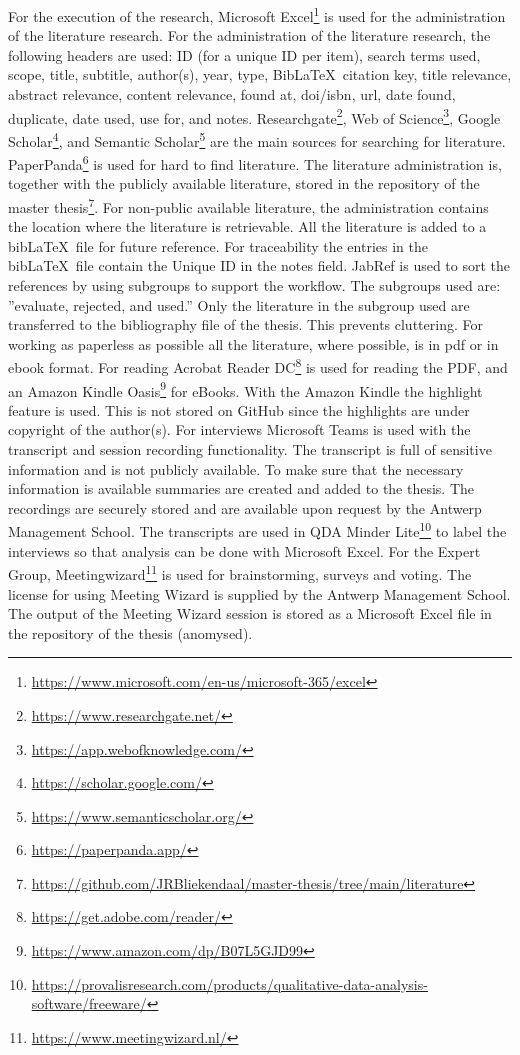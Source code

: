 For the execution of the research, Microsoft Excel\footnote{\url{https://www.microsoft.com/en-us/microsoft-365/excel}} is used for the administration of the literature research. For the administration of the literature research, the following headers are used: ID (for a unique ID per item), search terms used, scope, title, subtitle, author(s), year, type, Bib\LaTeX\ citation key, title relevance, abstract relevance, content relevance, found at, doi/isbn, url, date found, duplicate, date used, use for, and notes. Researchgate\footnote{\url{https://www.researchgate.net/}}, Web of Science\footnote{\url{https://app.webofknowledge.com/}}, Google Scholar\footnote{\url{https://scholar.google.com/}}, and Semantic Scholar\footnote{\url{https://www.semanticscholar.org/}} are the main sources for searching for literature. PaperPanda\footnote{\url{https://paperpanda.app/}} is used for hard to find literature. The literature administration is, together with the publicly available literature, stored in the repository of the master thesis\footnote{\url{https://github.com/JRBliekendaal/master-thesis/tree/main/literature}}. For non-public available literature, the administration contains the location where the literature is retrievable. All the literature is added to a bib\LaTeX\ file for future reference. For traceability the entries in the bib\LaTeX\ file contain the Unique ID in the notes field. JabRef is used to sort the references by using subgroups to support the workflow. The subgroups used are: ''evaluate, rejected, and used.'' Only the literature in the subgroup used are transferred to the bibliography file of the thesis. This prevents cluttering. For working as paperless as possible all the literature, where possible, is in pdf or in ebook format. For reading Acrobat Reader DC\footnote{\url{https://get.adobe.com/reader/}} is used for reading the PDF, and an Amazon Kindle Oasis\footnote{\url{https://www.amazon.com/dp/B07L5GJD99}} for eBooks. With the Amazon Kindle the highlight feature is used. This is not stored on GitHub since the highlights are under copyright of the author(s). For interviews Microsoft Teams is used with the transcript and session recording functionality. The transcript is full of sensitive information and is not publicly available. To make sure that the necessary information is available summaries are created and added to the thesis. The recordings are securely stored and are available upon request by the Antwerp Management School. The transcripts are used in QDA Minder Lite\footnote{\url{https://provalisresearch.com/products/qualitative-data-analysis-software/freeware/}} to label the interviews so that analysis can be done with Microsoft Excel. For the Expert Group, Meetingwizard\footnote{\url{https://www.meetingwizard.nl/}} is used for brainstorming, surveys and voting. The license for using Meeting Wizard is supplied by the Antwerp Management School. The output of the Meeting Wizard session is stored as a Microsoft Excel file in the repository of the thesis (anomysed).
